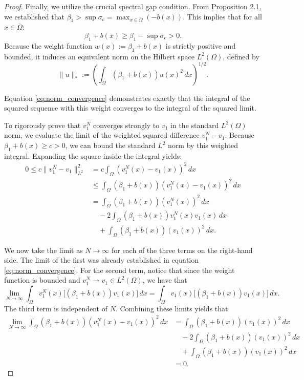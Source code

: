 \documentclass[11pt, a4paper]{article}
\theoremstyle{break}
\theoremstyle{break}
\theoremstyle{break}
\theoremstyle{break}
\theoremstyle{break}
\theoremstyle{break}
\theoremstyle{break}
\theoremstyle{break}
\theoremstyle{break}
\begin{document}
\begin{proof}
    Finally, we utilize the crucial spectral gap condition. From Proposition 2.1, we established that $\beta_1 > \sup \sigma_c = \max_{x \in \overline{\Omega}} (-b(x))$. This implies that for all $x \in \overline{\Omega}$:
    \begin{equation}
        \beta_1 + b(x) \geq \beta_1 - \sup \sigma_c > 0.
    \end{equation}
    Because the weight function $w(x) := \beta_1 + b(x)$ is strictly positive and bounded, it induces an equivalent norm on the Hilbert space $L^2(\Omega)$, defined by
    \begin{equation}
        \|u\|_{*} := \left( \int_\Omega (\beta_1 + b(x)) u(x)^2 \, dx \right)^{1/2}.
    \end{equation}
    
    Equation \eqref{eq:norm_convergence} demonstrates exactly that the integral of the squared sequence with this weight converges to the integral of the squared limit. 
    
    To rigorously prove that $v_1^N$ converges strongly to $v_1$ in the standard $L^2(\Omega)$ norm, we evaluate the limit of the weighted squared difference $v_1^N - v_1$. Because $\beta_1 + b(x) \geq c > 0$, we can bound the standard $L^2$ norm by this weighted integral. Expanding the square inside the integral yields:
    \begin{align}
        0 \leq c \|v_1^N - v_1\|_{L^2}^2 &= c \int_\Omega (v_1^N(x) - v_1(x))^2 \, dx \nonumber \\
        &\leq \int_\Omega (\beta_1 + b(x))(v_1^N(x) - v_1(x))^2 \, dx \nonumber \\
        &= \int_\Omega (\beta_1 + b(x))(v_1^N(x))^2 \, dx \nonumber \\
        &\quad - 2 \int_\Omega (\beta_1 + b(x))v_1^N(x)v_1(x) \, dx \nonumber \\
        &\quad + \int_\Omega (\beta_1 + b(x))(v_1(x))^2 \, dx.
    \end{align}
    
    We now take the limit as $N \to \infty$ for each of the three terms on the right-hand side. The limit of the first was already established in equation \eqref{eq:norm_convergence}. For the second term, notice that since the weight function is bounded  and $v_1^N \rightharpoonup v_1 \in L^2(\Omega)$, we have that
    \begin{equation}
        \lim_{N \to \infty} \int_\Omega v_1^N(x) \big[ (\beta_1 + b(x)) v_1(x) \big] \, dx = \int_\Omega v_1(x) \big[ (\beta_1 + b(x)) v_1(x) \big] \, dx.
    \end{equation}
    The third term is independent of $N$. Combining these limits yields that
    \begin{align}
        \lim_{N \to \infty} \int_\Omega (\beta_1 + b(x))(v_1^N(x) - v_1(x))^2 \, dx 
        &= \int_\Omega (\beta_1 + b(x))(v_1(x))^2 \, dx \nonumber \\
        &\quad - 2 \int_\Omega (\beta_1 + b(x))(v_1(x))^2 \, dx \nonumber \\
        &\quad + \int_\Omega (\beta_1 + b(x))(v_1(x))^2 \, dx \nonumber \\
        &= 0.
    \end{align}
    

\end{proof}
\end{document}
